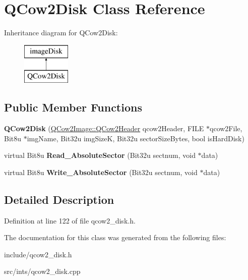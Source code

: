\hypertarget{classQCow2Disk}{\section{Q\-Cow2\-Disk Class Reference}
\label{classQCow2Disk}
}
Inheritance diagram for Q\-Cow2\-Disk\-:\begin{figure}[H]
\begin{center}
\leavevmode
\includegraphics[height=2.000000cm]{classQCow2Disk}
\end{center}
\end{figure}
\subsection*{Public Member Functions}
\begin{DoxyCompactItemize}
\item 
\hypertarget{classQCow2Disk_ab5c7ce6db2758362d56c1ee4d9823003}{{\bfseries Q\-Cow2\-Disk} (\hyperlink{structQCow2Image_1_1QCow2Header}{Q\-Cow2\-Image\-::\-Q\-Cow2\-Header} qcow2\-Header, F\-I\-L\-E $\ast$qcow2\-File, Bit8u $\ast$img\-Name, Bit32u img\-Size\-K, Bit32u sector\-Size\-Bytes, bool is\-Hard\-Disk)}\label{classQCow2Disk_ab5c7ce6db2758362d56c1ee4d9823003}

\item 
\hypertarget{classQCow2Disk_add204620c64ed072d1325c5ea074af69}{virtual Bit8u {\bfseries Read\-\_\-\-Absolute\-Sector} (Bit32u sectnum, void $\ast$data)}\label{classQCow2Disk_add204620c64ed072d1325c5ea074af69}

\item 
\hypertarget{classQCow2Disk_a115e703bd6dc760d49e5131a244c85a0}{virtual Bit8u {\bfseries Write\-\_\-\-Absolute\-Sector} (Bit32u sectnum, void $\ast$data)}\label{classQCow2Disk_a115e703bd6dc760d49e5131a244c85a0}

\end{DoxyCompactItemize}


\subsection{Detailed Description}


Definition at line 122 of file qcow2\-\_\-disk.\-h.



The documentation for this class was generated from the following files\-:\begin{DoxyCompactItemize}
\item 
include/qcow2\-\_\-disk.\-h\item 
src/ints/qcow2\-\_\-disk.\-cpp\end{DoxyCompactItemize}
